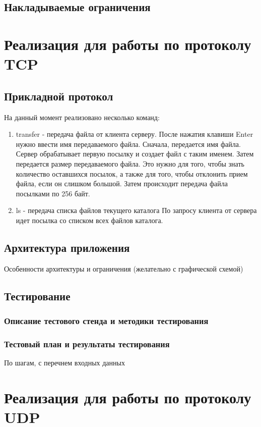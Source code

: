 \documentclass[12pt,a4paper]{report}
\begin{document}
\section{Накладываемые ограничения}

\chapter{Реализация для работы по протоколу TCP}
\section{Прикладной протокол}
\label{protocol_tcp}
На данный момент реализовано несколько команд:
\begin{enumerate}
\item{transfer - передача файла от клиента серверу.} После нажатия клавиши Enter нужно ввести имя передаваемого файла.
Сначала, передается имя файла. Сервер обрабатывает первую посылку и создает файл с таким именем. Затем передается размер передаваемого файла. Это нужно для того, чтобы знать количество оставшихся посылок, а также для того, чтобы отклонить прием файла, если он слишком большой. Затем происходит передача файла посылками по 256 байт. 
\item{ls - передача списка файлов текущего каталога}
По запросу клиента от сервера идет посылка со списком всех файлов каталога.
\end{enumerate} 

\section{Архитектура приложения}
Особенности архитектуры и ограничения (желательно с графической схемой) 

\section{Тестирование}
\subsection{Описание тестового стенда и методики тестирования}
\subsection{Тестовый план и результаты тестирования}
По шагам, с перечнем входных данных

\chapter{Реализация для работы по протоколу UDP}
\end{document}
